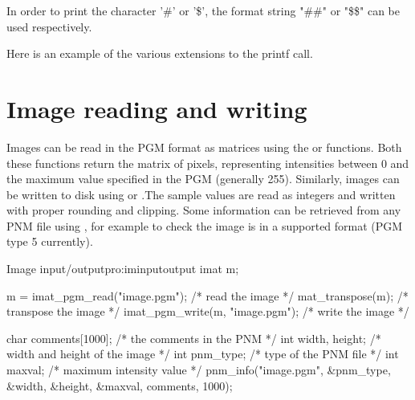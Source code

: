       In order to print the character '\#' or '\$', the format string
      "\#\#" or "\$\$" can be used respectively.

      Here is an example of the various extensions to the printf call.



\section{Image reading and writing}
\label{sec:imreadwrite}

Images can be read in the PGM format as matrices using the
       or 
      functions. Both these functions return the matrix of pixels,
      representing intensities between 0 and the maximum value
      specified in the PGM (generally 255). Similarly, images can be
      written to disk using  or 
      .The sample
      values are read as integers and written with proper rounding and
      clipping. Some information can be retrieved from any PNM file
      using , for
      example to check the image is in a supported format (PGM type 5
      currently).

\begin{program}{Image input/output}{pro:iminputoutput}
  imat m;

  m = imat_pgm_read("image.pgm");  /* read the image      */
  mat_transpose(m);                /* transpose the image */
  imat_pgm_write(m, "image.pgm");  /* write the image     */

  char comments[1000]; /* the comments in the PNM       */
  int width, height;   /* width and height of the image */
  int pnm_type;        /* type of the PNM file          */
  int maxval;          /* maximum intensity value       */
  pnm_info("image.pgm",  &pnm_type,  &width,  &height, &maxval, comments, 1000);
\end{program}



